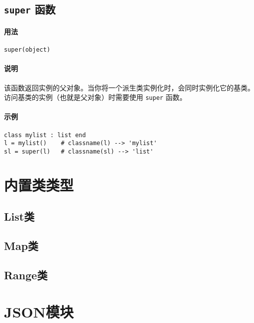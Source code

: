 \subsection{\texttt{super} 函数}

\paragraph{用法}
\begin{lstlisting}[language=berry, numbers=none]
super(object)
\end{lstlisting}

\paragraph{说明}
该函数返回实例的父对象。当你将一个派生类实例化时，会同时实例化它的基类。访问基类的实例（也就是父对象）时需要使用 \texttt{super} 函数。

\paragraph{示例}
\begin{lstlisting}[language=berry, numbers=none]
class mylist : list end
l = mylist()    # classname(l) --> 'mylist'
sl = super(l)   # classname(sl) --> 'list'
\end{lstlisting}

\section{内置类类型}

\subsection{List类}

\subsection{Map类}

\subsection{Range类}

\section{JSON模块}


